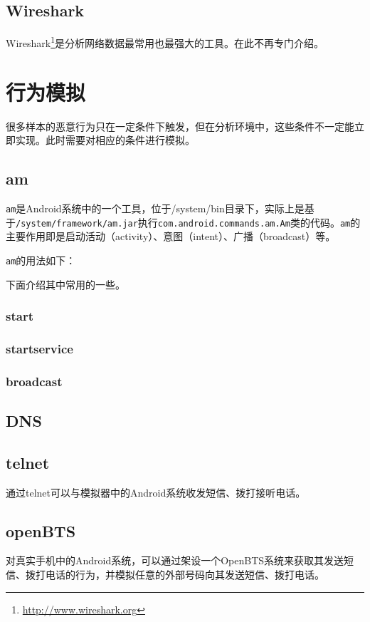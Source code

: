 \subsection{Wireshark}
Wireshark\footnote{\url{http://www.wireshark.org}}是分析网络数据最常用也最强大的工具。在此不再专门介绍。

\section{行为模拟}
很多样本的恶意行为只在一定条件下触发，但在分析环境中，这些条件不一定能立即实现。此时需要对相应的条件进行模拟。

\subsection{am}
\lstinline!am!是Android系统中的一个工具，位于/system/bin目录下，实际上是基于\lstinline!/system/framework/am.jar!执行\lstinline!com.android.commands.am.Am!类的代码。\lstinline!am!的主要作用即是启动活动（activity）、意图（intent）、广播（broadcast）等。

\lstinline!am!的用法如下：

下面介绍其中常用的一些。

\subsubsection{start}
\subsubsection{startservice}
\subsubsection{broadcast}

\subsection{DNS}

\subsection{telnet}
通过telnet可以与模拟器中的Android系统收发短信、拨打接听电话。

\subsection{openBTS}
对真实手机中的Android系统，可以通过架设一个OpenBTS系统来获取其发送短信、拨打电话的行为，并模拟任意的外部号码向其发送短信、拨打电话。

